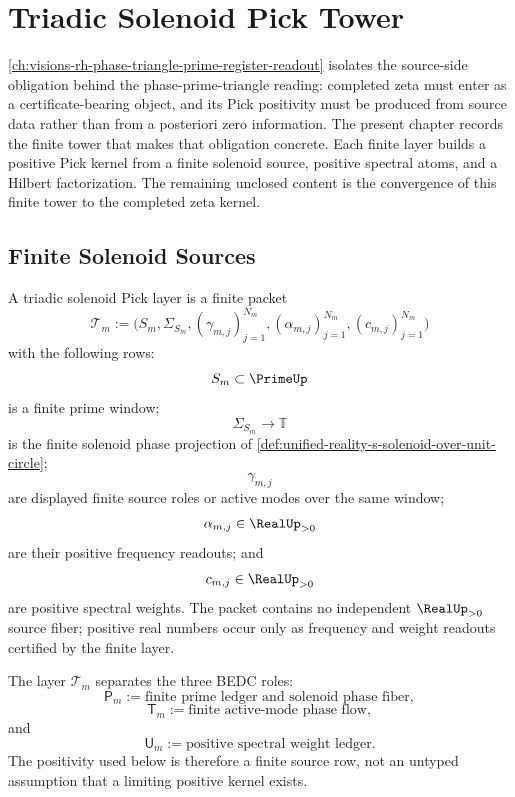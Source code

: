 \chapter{Triadic Solenoid Pick Tower}
\label{ch:visions-rh-triadic-solenoid-pick-tower}

\autoref{ch:visions-rh-phase-triangle-prime-register-readout} isolates
the source-side obligation behind the phase-prime-triangle reading:
completed zeta must enter as a certificate-bearing object, and its Pick
positivity must be produced from source data rather than from a posteriori
zero information. The present chapter records the finite tower that makes
that obligation concrete. Each finite layer builds a positive Pick kernel
from a finite solenoid source, positive spectral atoms, and a Hilbert
factorization. The remaining unclosed content is the convergence of this
finite tower to the completed zeta kernel.

\section{Finite Solenoid Sources}
\label{sec:rh-triadic-solenoid-finite-sources}

\begin{definition}
\label{def:rh-triadic-solenoid-pick-layer}
A triadic solenoid Pick layer is a finite packet
$$
\mathcal T_m
:=
\bigl(
S_m,\Sigma_{S_m},
(\gamma_{m,j})_{j=1}^{N_m},
(\alpha_{m,j})_{j=1}^{N_m},
(c_{m,j})_{j=1}^{N_m}
\bigr)
$$
with the following rows:
$$
S_m\subset\PrimeUp
$$
is a finite prime window;
$$
\Sigma_{S_m}\to\mathbb T
$$
is the finite solenoid phase projection of
\autoref{def:unified-reality-s-solenoid-over-unit-circle};
$$
\gamma_{m,j}
$$
are displayed finite source roles or active modes over the same window;
$$
\alpha_{m,j}\in\RealUp_{>0}
$$
are their positive frequency readouts; and
$$
c_{m,j}\in\RealUp_{>0}
$$
are positive spectral weights. The packet contains no independent
$\RealUp_{>0}$ source fiber; positive real numbers occur only as frequency
and weight readouts certified by the finite layer.
\end{definition}

\begin{principle}
\label{prin:rh-triadic-layer-roles}
The layer $\mathcal T_m$ separates the three BEDC roles:
$$
\mathsf P_m
:=
\text{finite prime ledger and solenoid phase fiber},
$$
$$
\mathsf T_m
:=
\text{finite active-mode phase flow},
$$
and
$$
\mathsf U_m
:=
\text{positive spectral weight ledger}.
$$
The positivity used below is therefore a finite source row, not an
untyped assumption that a limiting positive kernel exists.
\end{principle}


